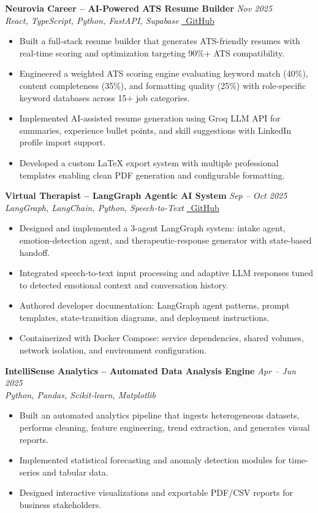 \documentclass[11pt]{article}
\begin{document}
\textbf{Neurovia Career -- AI-Powered ATS Resume Builder} \hfill \textit{Nov 2025} \\
\textit{React, TypeScript, Python, FastAPI, Supabase} \hfill \href{https://github.com/JeetInTech/CvForge-Online}{\faGithub\ GitHub}
\begin{itemize}
\item Built a full-stack resume builder that generates ATS-friendly resumes with real-time scoring and optimization targeting 90\%+ ATS compatibility.
\item Engineered a weighted ATS scoring engine evaluating keyword match (40\%), content completeness (35\%), and formatting quality (25\%) with role-specific keyword databases across 15+ job categories.
\item Implemented AI-assisted resume generation using Groq LLM API for summaries, experience bullet points, and skill suggestions with LinkedIn profile import support.
\item Developed a custom \LaTeX{} export system with multiple professional templates enabling clean PDF generation and configurable formatting.
\end{itemize}

\textbf{Virtual Therapist -- LangGraph Agentic AI System} \hfill \textit{Sep -- Oct 2025} \\
\textit{LangGraph, LangChain, Python, Speech-to-Text} \hfill \href{https://github.com/JeetInTech/Virtual-Therapist---LangGraph-Agentic-AI-System}{\faGithub\ GitHub}
\begin{itemize}
\item Designed and implemented a 3-agent LangGraph system: intake agent, emotion-detection agent, and therapeutic-response generator with state-based handoff.
\item Integrated speech-to-text input processing and adaptive LLM responses tuned to detected emotional context and conversation history.
\item Authored developer documentation: LangGraph agent patterns, prompt templates, state-transition diagrams, and deployment instructions.
\item Containerized with Docker Compose: service dependencies, shared volumes, network isolation, and environment configuration.
\end{itemize}

\textbf{IntelliSense Analytics -- Automated Data Analysis Engine} \hfill \textit{Apr -- Jun 2025} \\
\textit{Python, Pandas, Scikit-learn, Matplotlib}
\begin{itemize}
\item Built an automated analytics pipeline that ingests heterogeneous datasets, performs cleaning, feature engineering, trend extraction, and generates visual reports.
\item Implemented statistical forecasting and anomaly detection modules for time-series and tabular data.
\item Designed interactive visualizations and exportable PDF/CSV reports for business stakeholders.
\end{itemize}
\end{document}
